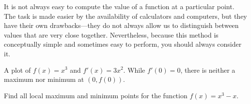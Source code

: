 It is not always easy to compute the value of a function at a
particular point. The task is made easier by the availability of
calculators and computers, but they have their own drawbacks---they do
not always allow us to distinguish between values that are very close
together. Nevertheless, because this method is conceptually simple and
sometimes easy to perform, you should always consider it.

\begin{marginfigure}[0in]
\caption{A plot of $f(x) = x^3$ and $f'(x) = 3x^2$. While $f'(0)=0$,
  there is neither a maximum nor minimum at $(0,f(0))$.}
\label{figure:x^3}
\end{marginfigure}


\begin{example}
Find all local maximum and minimum points for the function 
$f(x)=x^3-x$. 
\end{example}

